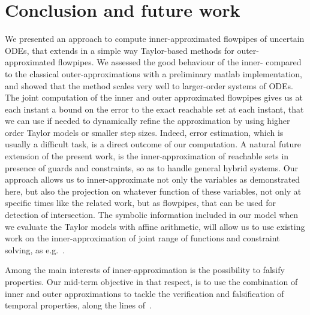 \documentclass{sig-alternate-05-2015} %
\begin{document}
\section{Conclusion and future work}
%
We presented an approach to compute inner-approximated flowpipes of uncertain ODEs, that extends in a simple way Taylor-based 
methods for outer-approximated flowpipes. We assessed the good behaviour of the inner- compared to the classical outer-approximations
with a preliminary matlab implementation, and showed that the method scales very well to larger-order systems of ODEs. 
The joint computation of the inner and outer approximated flowpipes gives us at each instant a bound on the error to the exact reachable 
set at each instant, that we can use if needed to dynamically refine the approximation by using higher order Taylor models or smaller step sizes. 
Indeed, error estimation, which is usually a difficult task, is a direct outcome of our computation.
A natural future extension of the present work, is the inner-approximation of reachable sets 
in presence of guards and constraints, so as to handle general hybrid systems. Our approach allows us to inner-approximate 
not only the variables as demonstrated here, but also the projection on whatever function of these variables, not only at 
specific times like the related work, but as flowpipes, that can be used for detection of intersection. 
The symbolic information included in our model  when we evaluate the Taylor models with affine arithmetic, 
will allow us to use existing work on the inner-approximation 
of joint range of functions and constraint solving, as e.g.~\cite{DBLP:journals/constraints/IshiiGJ12}.  

Among the main interests of inner-approximation is the possibility to falsify properties. Our mid-term objective in that respect, 
is to use the combination of inner and outer approximations to tackle the verification and falsification of temporal properties, 
along the lines of~\cite{falsification2,IshiiYG16}. 
\end{document}
